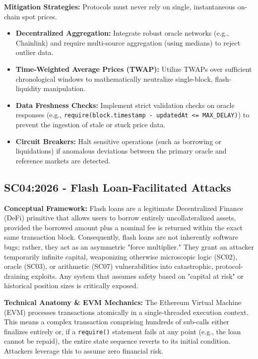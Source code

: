 \textbf{Mitigation Strategies:} Protocols must never rely on single, instantaneous on-chain spot prices.
\begin{itemize}
    \item \textbf{Decentralized Aggregation:} Integrate robust oracle networks (e.g., Chainlink) and require multi-source aggregation (using medians) to reject outlier data.
    \item \textbf{Time-Weighted Average Prices (TWAP):} Utilize TWAPs over sufficient chronological windows to mathematically neutralize single-block, flash-liquidity manipulation.
    \item \textbf{Data Freshness Checks:} Implement strict validation checks on oracle responses (e.g., \texttt{require(block.timestamp - updatedAt <= MAX\_DELAY)}) to prevent the ingestion of stale or stuck price data.
    \item \textbf{Circuit Breakers:} Halt sensitive operations (such as borrowing or liquidations) if anomalous deviations between the primary oracle and reference markets are detected.
\end{itemize}

\subsection{SC04:2026 - Flash Loan-Facilitated Attacks}
\textbf{Conceptual Framework:} Flash loans are a legitimate Decentralized Finance (DeFi) primitive that allows users to borrow entirely uncollateralized assets, provided the borrowed amount plus a nominal fee is returned within the exact same transaction block. Consequently, flash loans are not inherently software bugs; rather, they act as an asymmetric "force multiplier." They grant an attacker temporarily infinite capital, weaponizing otherwise microscopic logic (SC02), oracle (SC03), or arithmetic (SC07) vulnerabilities into catastrophic, protocol-draining exploits. Any system that assumes safety based on "capital at risk" or historical position sizes is critically exposed.

\textbf{Technical Anatomy \& EVM Mechanics:} The Ethereum Virtual Machine (EVM) processes transactions atomically in a single-threaded execution context. This means a complex transaction comprising hundreds of sub-calls either finalizes entirely or, if a \texttt{require()} statement fails at any point (e.g., the loan cannot be repaid), the entire state sequence reverts to its initial condition. Attackers leverage this to assume zero financial risk. 

